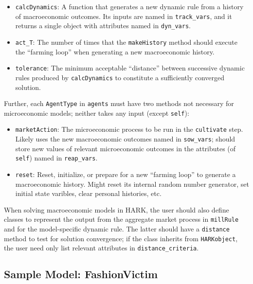 \documentclass[12pt,titlepage,letterpaper]{econtex}
\begin{document}
\begin{itemize}
\item \texttt{calcDynamics}: A function that generates a new dynamic rule from a history of macroeconomic outcomes.  Its inputs are named in \texttt{track\_vars}, and it returns a single object with attributes named in \texttt{dyn\_vars}.

\item \texttt{act\_T}: The number of times that the \texttt{makeHistory} method should execute the ``farming loop'' when generating a new macroeconomic history.

\item \texttt{tolerance}: The minimum acceptable ``distance'' between successive dynamic rules produced by \texttt{calcDynamics} to constitute a sufficiently converged solution.
\end{itemize}

Further, each \texttt{AgentType} in \texttt{agents} must have two methods not necessary for microeconomic models; neither takes any input (except \texttt{self}):
\begin{itemize}
\item \texttt{marketAction}: The microeconomic process to be run in the \texttt{cultivate} step.  Likely uses the new macroeconomic outcomes named in \texttt{sow\_vars}; should store new values of relevant microeconomic outcomes in the attributes (of \texttt{self}) named in \texttt{reap\_vars}.

\item \texttt{reset}: Reset, initialize, or prepare for a new ``farming loop'' to generate a macroeconomic history.  Might reset its internal random number generator, set initial state varibles, clear personal histories, etc.
\end{itemize}

When solving macroeconomic models in HARK, the user should also define classes to represent the output from the aggregate market process in \texttt{millRule} and for the model-specific dynamic rule.  The latter should have a \texttt{distance} method to test for solution convergence; if the class inherits from \texttt{HARKobject}, the user need only list relevant attributes in \texttt{distance\_criteria}.

\subsection{Sample Model: FashionVictim}\label{sec:FashionVictim}
\end{document}
